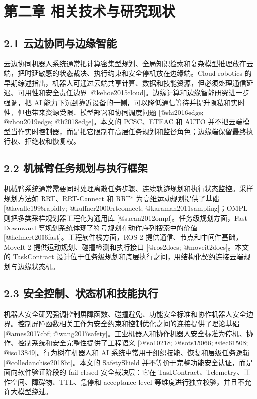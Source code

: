 \chapter{第二章 相关技术与研究现状}

\section{2.1 云边协同与边缘智能}

云边协同机器人系统通常把计算密集型规划、全局知识检索和复杂模型推理放在云端，把时延敏感的状态裁决、执行约束和安全停机放在边缘端。Cloud robotics 的早期综述指出，机器人可通过云端共享计算、数据和技能资源，但必须处理通信延迟、可用性和安全责任边界 [@kehoe2015cloud]。边缘计算和边缘智能研究进一步强调，把 AI 能力下沉到靠近设备的一侧，可以降低通信等待并提升隐私和实时性，但也带来资源受限、模型部署和协同调度问题 [@shi2016edge; @zhou2019edge; @li2018edge]。本文的 PCSC、ETEAC 和 AUTO 并不把云端模型当作实时控制器，而是把它限制在高层任务规划和监督角色；边缘端保留最终执行权、拒绝权和恢复权。\par

\section{2.2 机械臂任务规划与执行框架}

机械臂系统通常需要同时处理离散任务步骤、连续轨迹规划和执行状态监控。采样规划方法如 RRT、RRT-Connect 和 RRT* 为高维运动规划提供了基础 [@lavalle1998rapidly; @kuffner2000rrtconnect; @karaman2011sampling]；OMPL 则把多类采样规划器工程化为通用库 [@sucan2012ompl]。任务级规划方面，Fast Downward 等规划系统体现了符号规划在动作序列搜索中的价值 [@helmert2006fast]。工程软件栈方面，ROS 2 提供通信、节点和中间件基础，MoveIt 2 提供运动规划、碰撞检测和执行接口 [@ros2docs; @moveit2docs]。本文的 TaskContract 设计位于任务级规划和底层执行之间，用结构化契约连接云端规划与边缘状态机。\par

\section{2.3 安全控制、状态机和技能执行}

机器人安全研究强调控制屏障函数、碰撞避免、功能安全标准和协作机器人安全边界。控制屏障函数相关工作为安全约束和控制优化之间的连接提供了理论基础 [@ames2017cbf; @wang2017safety]。工业机器人和协作机器人安全标准为停机、协作、控制系统和安全完整性提供了工程语义 [@iso10218; @isots15066; @iec61508; @iso13849]。行为树在机器人和 AI 系统中常用于组织技能、恢复和层级任务逻辑 [@colledanchise2018bt]。本文的 SafetyShield 并不等价于完整功能安全认证，而是面向软件验证阶段的 fail-closed 安全裁决层：它在 TaskContract、Telemetry、工作空间、障碍物、TTL、急停和 acceptance level 等维度进行独立校验，并且不允许大模型绕过。\par

